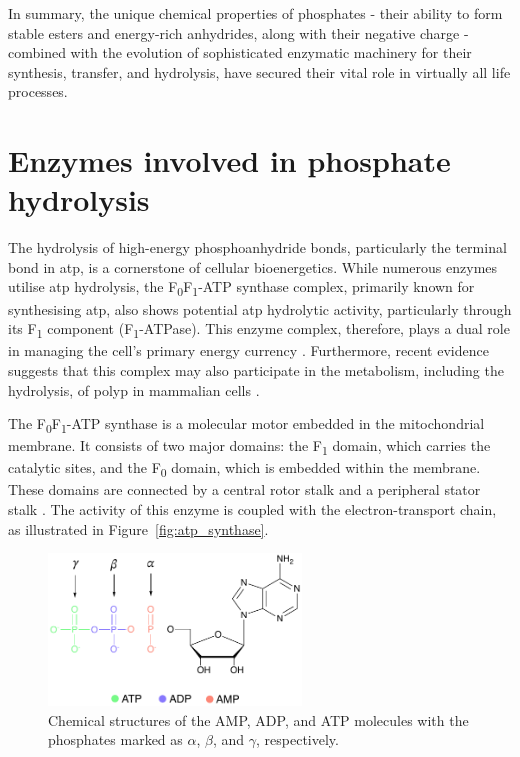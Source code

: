In summary, the unique chemical properties of phosphates - their ability to form stable esters and energy-rich anhydrides, along with their negative charge - combined with the evolution of sophisticated enzymatic machinery for their synthesis, transfer, and hydrolysis, have secured their vital role in virtually all life processes.



\section{Enzymes involved in phosphate hydrolysis}
The hydrolysis of high-energy phosphoanhydride bonds, particularly the terminal bond in \ac{atp}, is a cornerstone of cellular bioenergetics. While numerous enzymes utilise \ac{atp} hydrolysis, the F\textsubscript{0}F\textsubscript{1}-ATP synthase complex, primarily known for synthesising \ac{atp}, also shows potential \ac{atp} hydrolytic activity, particularly through its F\textsubscript{1} component (F\textsubscript{1}-ATPase). This enzyme complex, therefore, plays a dual role in managing the cell's primary energy currency \citep{bonoraATPSynthesisStorage2012, boyerEnergyLifeATP1998, walkerATPSynthaseUnderstood2013}. Furthermore, recent evidence suggests that this complex may also participate in the metabolism, including the hydrolysis, of \ac{polyp} in mammalian cells \citep{baevInorganicPolyphosphateF0F1ATP2022, baevInorganicPolyphosphateProduced2020}.

The F\textsubscript{0}F\textsubscript{1}-ATP synthase is a molecular motor embedded in the mitochondrial membrane. It consists of two major domains: the F\textsubscript{1} domain, which carries the catalytic sites, and the F\textsubscript{0} domain, which is embedded within the membrane. These domains are connected by a central rotor stalk and a peripheral stator stalk \citep{walkerATPSynthesisRotary1998, walkerATPSynthaseUnderstood2013, wattBioenergeticCostMaking2010}. The activity of this enzyme is coupled with the electron-transport chain, as illustrated in Figure~\ref{fig:atp_synthase}.

\begin{figure}[t!]
    \centering
    \includegraphics[width=0.6\textwidth]{Figures/1_Introduction/intro_atp.pdf}
    \caption{Chemical structures of the AMP, ADP, and ATP molecules with the phosphates marked as $\alpha$, $\beta$, and $\gamma$, respectively.}
    \label{fig:atp}
\end{figure}

